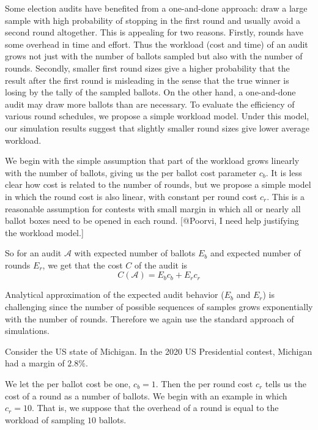 Some election audits have benefited from a one-and-done approach: draw a large sample with high probability of stopping in the first round and usually avoid a second round altogether. This is appealing for two reasons. Firstly, rounds have some overhead in time and effort. Thus the workload (cost and time) of an audit grows not just with the number of ballots sampled but also with the number of rounds. Secondly, smaller first round sizes give a higher probability that the result after the first round is misleading in the sense that the true winner is losing by the tally of the sampled ballots. On the other hand, a one-and-done audit may draw more ballots than are necessary. To evaluate the efficiency of various round schedules, we propose a simple workload model. Under this model, our simulation results suggest that slightly smaller round sizes give lower average workload. 

We begin with the simple assumption that part of the workload grows linearly with the number of ballots, giving us the per ballot cost parameter $c_{b}$. It is less clear how cost is related to the number of rounds, but we propose a simple model in which the round cost is also linear, with constant per round cost $c_{r}$. This is a reasonable assumption for contests with small margin in which all or nearly all ballot boxes need to be opened in each round. [@Poorvi, I need help justifying the workload model.]

So for an audit $\mathcal{A}$ with expected number of ballots $E_{b}$ and expected number of rounds $E_{r}$, we get that the cost $C$ of the audit is
\begin{equation}
C(\mathcal{A}) = E_b c_b + E_r c_r
\label{eq:cost}
\end{equation}

Analytical approximation of the expected audit behavior ($E_b$ and $E_r$) is challenging since the number of possible sequences of samples grows exponentially with the number of rounds. 
Therefore we again use the standard approach of simulations.

Consider the US state of Michigan. In the 2020 US Presidential contest, Michigan had a margin of $2.8\%$.

We let the per ballot cost be one, $c_b=1$. Then the per round cost $c_r$ tells us the cost of a round as a number of ballots. We begin with an example in which $c_r=10$. That is, we suppose that the overhead of a round is equal to the workload of sampling $10$ ballots.

